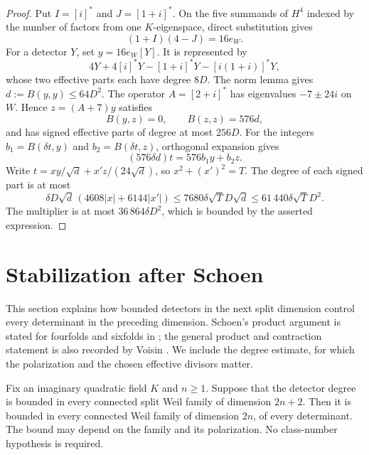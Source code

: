 \begin{proof}
Put $I=[i]^*$ and $J=[1+i]^*$. On the five summands of $H^4$ indexed by the number of factors from one $K$-eigenspace, direct substitution gives
\[
 (1+I)(4-J)=16e_W.
\]
For a detector $Y$, set $y=16e_W[Y]$. It is represented by
\[
 4Y+4[i]^*Y-[1+i]^*Y-[i(1+i)]^*Y,
\]
whose two effective parts each have degree $8D$. The norm lemma gives $d:=B(y,y)\leq64D^2$. The operator $A=[2+i]^*$ has eigenvalues $-7\pm24i$ on $W$. Hence $z=(A+7)y$ satisfies
\[
 B(y,z)=0,\qquad B(z,z)=576d,
\]
and has signed effective parts of degree at most $256D$. For the integers $b_1=B(\delta t,y)$ and $b_2=B(\delta t,z)$, orthogonal expansion gives
\[
 (576\delta d)t=576b_1y+b_2z.
\]
Write $t=x y/\sqrt d+x' z/(24\sqrt d)$, so $x^2+(x')^2=T$. The degree of each signed part is at most
\[
 \delta D\sqrt d\,(4608|x|+6144|x'|)
 \leq7680\delta\sqrt T D\sqrt d
 \leq61\,440\delta\sqrt T D^2.
\]
The multiplier is at most $36\,864\delta D^2$, which is bounded by the asserted expression.
\end{proof}

\section{Stabilization after Schoen}
\label{sec:stabilization}

This section explains how bounded detectors in the next split dimension control every determinant in the preceding dimension. Schoen's product argument is stated for fourfolds and sixfolds in \cite[Proposition~10, pp.~332--333]{Schoen98}; the general product and contraction statement is also recorded by Voisin \cite[Lemma~2.9]{VoisinB}. We include the degree estimate, for which the polarization and the chosen effective divisors matter.

\begin{theorem}\label{thm:stabilization}
Fix an imaginary quadratic field $K$ and $n\geq1$. Suppose that the detector degree is bounded in every connected split Weil family of dimension $2n+2$. Then it is bounded in every connected Weil family of dimension $2n$, of every determinant. The bound may depend on the family and its polarization. No class-number hypothesis is required.
\end{theorem}

